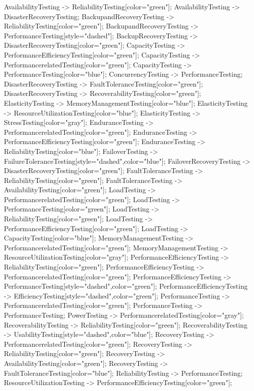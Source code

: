 \documentclass{article}
\begin{document}
{AvailabilityTesting -> ReliabilityTesting[color="green"];
AvailabilityTesting -> DisasterRecoveryTesting;
BackupandRecoveryTesting -> ReliabilityTesting[color="green"];
BackupandRecoveryTesting -> PerformanceTesting[style="dashed"];
BackupRecoveryTesting -> DisasterRecoveryTesting[color="green"];
CapacityTesting -> PerformanceEfficiencyTesting[color="green"];
CapacityTesting -> PerformancerelatedTesting[color="green"];
CapacityTesting -> PerformanceTesting[color="blue"];
ConcurrencyTesting -> PerformanceTesting;
DisasterRecoveryTesting -> FaultToleranceTesting[color="green"];
DisasterRecoveryTesting -> RecoverabilityTesting[color="green"];
ElasticityTesting -> MemoryManagementTesting[color="blue"];
ElasticityTesting -> ResourceUtilizationTesting[color="blue"];
ElasticityTesting -> StressTesting[color="gray"];
EnduranceTesting -> PerformancerelatedTesting[color="green"];
EnduranceTesting -> PerformanceEfficiencyTesting[color="green"];
EnduranceTesting -> ReliabilityTesting[color="blue"];
FailoverTesting -> FailureToleranceTesting[style="dashed",color="blue"];
FailoverRecoveryTesting -> DisasterRecoveryTesting[color="green"];
FaultToleranceTesting -> ReliabilityTesting[color="green"];
FaultToleranceTesting -> AvailabilityTesting[color="green"];
LoadTesting -> PerformancerelatedTesting[color="green"];
LoadTesting -> PerformanceTesting[color="green"];
LoadTesting -> ReliabilityTesting[color="green"];
LoadTesting -> PerformanceEfficiencyTesting[color="green"];
LoadTesting -> CapacityTesting[color="blue"];
MemoryManagementTesting -> PerformancerelatedTesting[color="green"];
MemoryManagementTesting -> ResourceUtilizationTesting[color="gray"];
PerformanceEfficiencyTesting -> ReliabilityTesting[color="green"];
PerformanceEfficiencyTesting -> PerformancerelatedTesting[color="green"];
PerformanceEfficiencyTesting -> PerformanceTesting[style="dashed",color="green"];
PerformanceEfficiencyTesting -> EfficiencyTesting[style="dashed",color="green"];
PerformanceTesting -> PerformancerelatedTesting[color="green"];
PerformanceTesting -> PerformanceTesting;
PowerTesting -> PerformancerelatedTesting[color="gray"];
RecoverabilityTesting -> ReliabilityTesting[color="green"];
RecoverabilityTesting -> UsabilityTesting[style="dashed",color="blue"];
RecoveryTesting -> PerformancerelatedTesting[color="green"];
RecoveryTesting -> ReliabilityTesting[color="green"];
RecoveryTesting -> AvailabilityTesting[color="green"];
RecoveryTesting -> FaultToleranceTesting[color="blue"];
ReliabilityTesting -> PerformanceTesting;
ResourceUtilizationTesting -> PerformanceEfficiencyTesting[color="green"];
}
\end{document}

